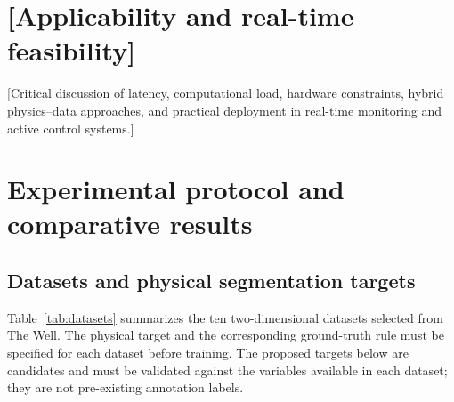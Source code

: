 \documentclass[final,5p,times,twocolumn]{elsarticle}
\begin{document}
\section{[Applicability and real-time feasibility]}\label{sec:sec6}

[Critical discussion of latency, computational load, hardware constraints, hybrid physics--data approaches, and practical deployment in real-time monitoring and active control systems.]



\section{Experimental protocol and comparative results}
\label{sec:experimental}

\subsection{Datasets and physical segmentation targets}
\label{subsec:datasets}

Table~\ref{tab:datasets} summarizes the ten two-dimensional datasets selected
from The Well. The physical target and the corresponding ground-truth rule
must be specified for each dataset before training. The proposed targets below
are candidates and must be validated against the variables available in each
dataset; they are not pre-existing annotation labels.
\end{document}

